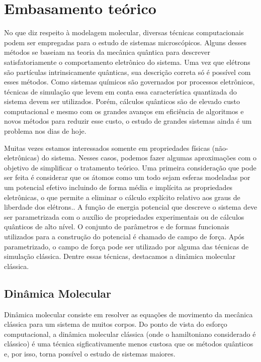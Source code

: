 \chapter{Embasamento teórico}
No que diz respeito à modelagem molecular, diversas técnicas computacionais podem ser empregadas para o estudo de sistemas microscópicos.
Alguns desses métodos se baseiam na teoria da mecânica quântica para descrever satisfatoriamente o comportamento eletrônico do sistema. 
Uma vez que elétrons são partículas intrinsicamente quânticas, sua descrição correta só é possível com esses métodos.
Como sistemas químicos são governados por processos eletrônicos, técnicas de simulação que levem em conta essa característica quantizada do sistema devem ser utilizados.
Porém, cálculos quânticos são de elevado custo computacional e mesmo com os grandes avanços em eficiência de algoritmos e novos métodos para reduzir esse custo, o estudo de grandes sistemas ainda é um problema nos dias de hoje.

Muitas vezes estamos interessados somente em propriedades físicas (não-eletrônicas) do sistema. Nesses casos, podemos fazer algumas aproximações com o objetivo de simplificar o tratamento teórico.
Uma primeira consideração que pode ser feita é considerar que os átomos como um todo sejam esferas modeladas por um potencial efetivo incluindo de forma média e implícita as propriedades eletrônicas, o que permite a eliminar o cálculo explícito relativo aos graus de liberdade dos elétrons..
A função de energia potencial que descreve o sistema deve ser parametrizada com o auxílio de propriedades experimentais ou de cálculos quânticos de alto nível.
O conjunto de parâmetros e de formas funcionais utilizados para a construção do potencial é chamado de campo de força.
Após parametrizado, o campo de força pode ser utilizado por alguma das técnicas de simulação clássica. Dentre essas técnicas, destacamos a dinâmica molecular clássica\cite{Jensen2017}.

\section{Dinâmica Molecular}

Dinâmica molecular consiste em resolver as equações de movimento da mecânica clássica para um sistema de muitos corpos.
Do ponto de vista do esforço computacional, a dinâmica molecular clássica (onde o hamiltoniano considerado é clássico) é uma técnica sigficativamente menos custosa que os métodos quânticos e, por isso, torna possível o estudo de sistemas maiores.

